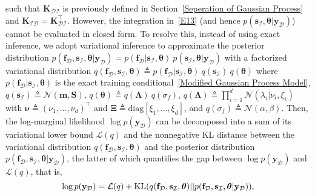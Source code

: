 \documentclass[conference]{IEEEtran}
\begin{document}
such that $\mathbf{K}_\mathcal{DI}$ is previously defined in Section~\ref{Seperation of Gaussian Process} and
$\mathbf{K}_\mathcal{ID} = \mathbf{K}^{\top}_\mathcal{DI}$. However, the integration in~\eqref{E13} (and hence $p(\mathbf{s}_\mathcal{I},\boldsymbol{\theta}|\mathbf{y}_\mathcal{D})$) cannot be evaluated in closed form. To resolve this, instead of using exact inference, we adopt variational inference to approximate the posterior distribution $p(\mathbf{f}_\mathcal{D},\mathbf{s}_\mathcal{I},\boldsymbol{\theta}|\mathbf{y}_\mathcal{D})=p(\mathbf{f}_\mathcal{D}|\mathbf{s}_\mathcal{I},\boldsymbol{\theta})\ p(\mathbf{s}_\mathcal{I},\boldsymbol{\theta}|\mathbf{y}_\mathcal{D})$ with a factorized variational distribution %
		$q(\mathbf{f}_\mathcal{D},\mathbf{s}_\mathcal{I},\boldsymbol{\theta})\triangleq p(\mathbf{f}_\mathcal{D}|\mathbf{s}_\mathcal{I},\boldsymbol{\theta})\ q(\mathbf{s}_\mathcal{I})\ q(\boldsymbol{\theta})$ %
where $p(\mathbf{f}_\mathcal{D}|\mathbf{s}_\mathcal{I},\boldsymbol{\theta})$ is the exact training conditional~\eqref{Modified Gaussian Process Model}, $	q(\mathbf{s}_\mathcal{I})\triangleq\mathcal{N}(\mathbf{m},\mathbf{S})$, 
$q(\boldsymbol{\theta}) \triangleq q(\mathbf{\Lambda})\ q(\sigma_f)$, 
$q(\mathbf{\Lambda})\triangleq\prod_{i=1}^{d}\mathcal{N}(\lambda_i|\nu_i,\xi_i)$ with $\boldsymbol{\nu} \triangleq (\nu_1,\ldots,\nu_d)^\top$ and $\mathbf{\Xi} \triangleq \mathrm{diag}[\xi_1,\ldots,\xi_d]$, and $q(\sigma_f)\triangleq\mathcal{N}(\alpha, \beta)$. Then, the log-marginal likelihood $\log p(\mathbf{y}_\mathcal{D})$ can be decomposed into a sum of its variational lower bound $\mathcal{L}(q)$ and the nonnegative KL distance between the variational distribution $q(\mathbf{f}_\mathcal{D},\mathbf{s}_\mathcal{I},\boldsymbol{\theta})$ and the posterior distribution $p(\mathbf{f}_\mathcal{D},\mathbf{s}_\mathcal{I},\boldsymbol{\theta}|\mathbf{y}_\mathcal{D})$, the latter of which quantifies the gap between $\log p(\mathbf{y}_\mathcal{D})$ and $\mathcal{L}(q)$, that is, 
\begin{equation}
\hspace{0mm}\log p(\mathbf{y}_\mathcal{D})\hspace{-0mm}=\hspace{-0mm}\mathcal{L}(q)+\mathrm{KL}(q(\mathbf{f}_\mathcal{D},\mathbf{s}_\mathcal{I},\boldsymbol{\theta})|| p(\mathbf{f}_\mathcal{D},\mathbf{s}_\mathcal{I},\boldsymbol{\theta}|\mathbf{y}_\mathcal{D})), \label{log likelihood}\vspace{-0mm}
\end{equation}
\end{document}
